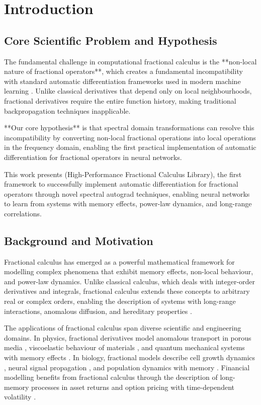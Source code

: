 \section{Introduction}

\subsection{Core Scientific Problem and Hypothesis}

The fundamental challenge in computational fractional calculus is the **non-local nature of fractional operators**, which creates a fundamental incompatibility with standard automatic differentiation frameworks used in modern machine learning \citep{Gong2015ComputationalChallengeFDE, baydin2018automatic}. Unlike classical derivatives that depend only on local neighbourhoods, fractional derivatives require the entire function history, making traditional backpropagation techniques inapplicable.

**Our core hypothesis** is that spectral domain transformations can resolve this incompatibility by converting non-local fractional operations into local operations in the frequency domain, enabling the first practical implementation of automatic differentiation for fractional operators in neural networks.

This work presents \hpfracc (High-Performance Fractional Calculus Library), the first framework to successfully implement automatic differentiation for fractional operators through novel spectral autograd techniques, enabling neural networks to learn from systems with memory effects, power-law dynamics, and long-range correlations.

\subsection{Background and Motivation}

Fractional calculus has emerged as a powerful mathematical framework for modelling complex phenomena that exhibit memory effects, non-local behaviour, and power-law dynamics. Unlike classical calculus, which deals with integer-order derivatives and integrals, fractional calculus extends these concepts to arbitrary real or complex orders, enabling the description of systems with long-range interactions, anomalous diffusion, and hereditary properties \citep{podlubny1999fractional, kilbas2006theory}.

The applications of fractional calculus span diverse scientific and engineering domains. In physics, fractional derivatives model anomalous transport in porous media \citep{metzler2000random}, viscoelastic behaviour of materials \citep{mainardi2010fractional}, and quantum mechanical systems with memory effects \citep{laskin2000fractional}. In biology, fractional models describe cell growth dynamics \citep{west2003fractional}, neural signal propagation \citep{anastasio1994fractional}, and population dynamics with memory \citep{petras2011fractional}. Financial modelling benefits from fractional calculus through the description of long-memory processes in asset returns \citep{cont2001empirical} and option pricing with time-dependent volatility \citep{cartea2007fractional}.


